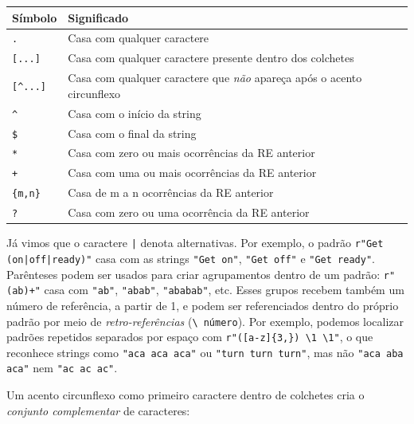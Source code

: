 \documentclass[11pt,a4paper]{article}
\begin{document}
\begin{center}
\begin{tabularx}{\textwidth}{lX}
\toprule
\textbf{Símbolo} & \textbf{Significado} \\
\midrule
\texttt{.} & Casa com qualquer caractere \\
\texttt{[...]} & Casa com qualquer caractere presente dentro dos colchetes \\
\texttt{[\^{}...]} & Casa com qualquer caractere que \emph{não} apareça após o acento circunflexo \\
\texttt{\^{}} & Casa com o início da string \\
\texttt{\$} & Casa com o final da string \\
\texttt{*} & Casa com zero ou mais ocorrências da RE anterior \\
\texttt{+} & Casa com uma ou mais ocorrências da RE anterior \\
\texttt{\{m,n\}} & Casa de m a n ocorrências da RE anterior \\
\texttt{?} & Casa com zero ou uma ocorrência da RE anterior \\
\bottomrule
\end{tabularx}
\end{center}

Já vimos que o caractere \texttt{|} denota alternativas. Por exemplo, o
padrão \texttt{r"Get (on|off|ready)"} casa com as strings
\texttt{"Get on"}, \texttt{"Get off"} e \texttt{"Get ready"}. Parênteses
podem ser usados para criar agrupamentos dentro de um padrão:
\texttt{r"(ab)+"} casa com \texttt{"ab"}, \texttt{"abab"},
\texttt{"ababab"}, etc. Esses grupos recebem também um número de
referência, a partir de 1, e podem ser referenciados dentro do próprio
padrão por meio de \emph{retro-referências} (\texttt{\textbackslash
número}). Por exemplo, podemos localizar padrões repetidos separados por
espaço com \texttt{r"([a-z]\{3,\}) \textbackslash 1 \textbackslash 1"}, o
que reconhece strings como \texttt{"aca aca aca"} ou
\texttt{"turn turn turn"}, mas não \texttt{"aca aba aca"} nem
\texttt{"ac ac ac"}.

Um acento circunflexo como primeiro caractere dentro de colchetes cria o
\emph{conjunto complementar} de caracteres:
\end{document}
